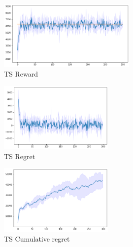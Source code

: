 \begin{figure}[ht]
    \begin{center}
    \includegraphics[width=0.6\textwidth]{img/ts_reward5.png}
    \caption{TS Reward}
    \label{fig:reward52}
    \end{center}
\end{figure}
\begin{multicols}{2}
    \begin{figure}[H]
        \begin{center}
        \includegraphics[width=0.5\textwidth]{img/ts_regret5.png}
        \caption{TS Regret}
        \label{fig:regret52}
        \end{center}
    \end{figure}
    \columnbreak
    \begin{figure}[H]
        \begin{center}
        \includegraphics[width=0.5\textwidth]{img/ts_cum_regret5.png}
        \caption{TS Cumulative regret}
        \label{fig:cum_reg52}
        \end{center}
    \end{figure}
\end{multicols}